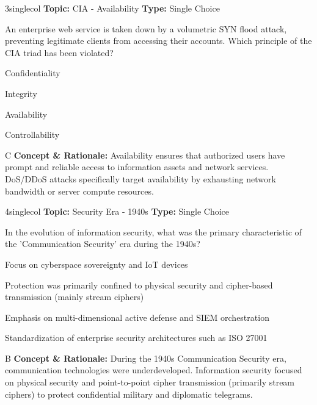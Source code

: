 \begin{qcard}{3}{singlecol}
\textcolor{darkslate!75}{\small\textbf{Topic:} CIA - Availability \hfill \textbf{Type:} Single Choice}\vspace{0.4em}\par
An enterprise web service is taken down by a volumetric SYN flood attack, preventing legitimate clients from accessing their accounts. Which principle of the CIA triad has been violated?
\begin{qoptions}
\item Confidentiality
\item Integrity
\item Availability
\item Controllability
\end{qoptions}
\end{qcard}
\nopagebreak
\begin{explainbox}{C}
\textbf{Concept \& Rationale:} Availability ensures that authorized users have prompt and reliable access to information assets and network services. DoS/DDoS attacks specifically target availability by exhausting network bandwidth or server compute resources.
\end{explainbox}

\begin{qcard}{4}{singlecol}
\textcolor{darkslate!75}{\small\textbf{Topic:} Security Era - 1940s \hfill \textbf{Type:} Single Choice}\vspace{0.4em}\par
In the evolution of information security, what was the primary characteristic of the 'Communication Security' era during the 1940s?
\begin{qoptions}
\item Focus on cyberspace sovereignty and IoT devices
\item Protection was primarily confined to physical security and cipher-based transmission (mainly stream ciphers)
\item Emphasis on multi-dimensional active defense and SIEM orchestration
\item Standardization of enterprise security architectures such as ISO 27001
\end{qoptions}
\end{qcard}
\nopagebreak
\begin{explainbox}{B}
\textbf{Concept \& Rationale:} During the 1940s Communication Security era, communication technologies were underdeveloped. Information security focused on physical security and point-to-point cipher transmission (primarily stream ciphers) to protect confidential military and diplomatic telegrams.
\end{explainbox}

